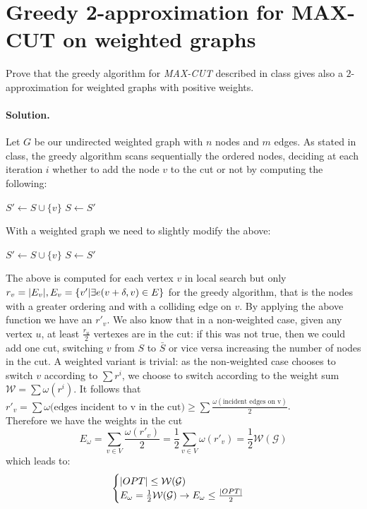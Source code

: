 \section{Greedy  2-approximation for  MAX-CUT  on  weighted  graphs}
Prove  that  the  greedy algorithm for \emph{MAX-CUT} described in class gives also a $2$-approximation for weighted graphs with positive weights.

\paragraph{Solution.}
Let $G$ be our undirected weighted graph with $n$ nodes and $m$ edges.
As stated in class, the greedy algorithm scans sequentially the ordered nodes, deciding at each iteration $i$ whether to add the node $v$ to the cut or not by computing the following:
	\begin{algorithmic}[1]
	\State $S' \gets S \cup \{v\}$\;
		\State $S \gets S'$\;
	\EndIf
	\EndFunction
	\end{algorithmic}
With a weighted graph we need to slightly modify the above:
	\begin{algorithmic}[1]
	\State $S' \gets S \cup \{v\}$\;
	\State $S \gets S'$\;
	\EndIf
	\EndFunction
\end{algorithmic}
The above is computed for each vertex $v$ in local search but only $r_v = \lvert E_v\rvert, E_v = \{v' | \exists e(v + \delta, v) \in E\}$ for the greedy algorithm, that is the nodes with a greater ordering and with a colliding edge on $v$.
By applying the above function we have an $r'_v$.
We also know that in a non-weighted case, given any vertex $u$, at least $\frac{r_u}{2}$ vertexes are in the cut: if this was not true, then we could add one cut, switching $v$ from $S$ to $\bar{S}$ or vice versa increasing the number of nodes in the cut.
A weighted variant is trivial: as the non-weighted case chooses to switch $v$ according to $\sum{r^i}$, we choose to switch according to the weight sum $\mathcal{W} = \sum{\omega(r^i)}$.
It follows that $r'_v = \sum{\omega(\text{edges incident to v in the cut}}) \geq \sum{\frac{\omega \left( \text{incident edges on v} \right)}{2}}$. \\
Therefore we have the weights in the cut
\begin{equation}
E_{\omega} = \sum_{v \in V}{\frac{\omega(r'_v)}{2}} =
\frac{1}{2} \sum_{v \in V}{\omega(r'_v)} =
\frac{1}{2} \mathcal{W(G)}
\end{equation}
which leads to:
\begin{equation*}
\begin{cases}
\lvert OPT\rvert \leq \mathcal{W(G)}	\\
E_{\omega}
= \frac{1}{2}
\mathcal{W(G)} \to E_{\omega} \leq \frac{\lvert OPT\rvert}{2} \\
\end{cases}
\end{equation*}